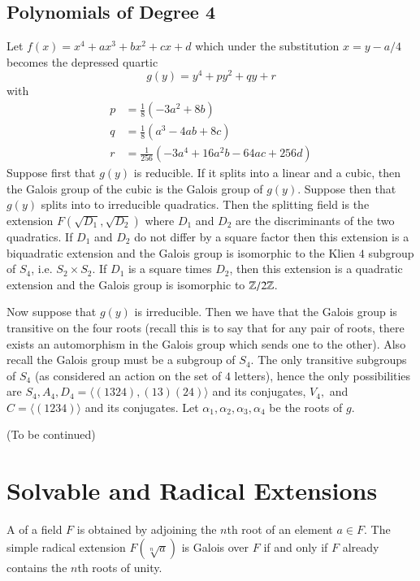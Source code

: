 \documentclass[12pt, a4paper, oneside, openright, titlepage]{book}
\begin{document}
\subsection{Polynomials of Degree 4}


Let $f(x) = x^4+ax^3+bx^2+cx+d$ which under the substitution $x = y-a/4$ becomes the depressed quartic \begin{equation*}
    g(y) = y^4 + py^2+qy+r
\end{equation*}
with \begin{align*}
    p &= \frac{1}{8}(-3a^2+8b) \\
    q &= \frac{1}{8}(a^3-4ab+8c) \\
    r &= \frac{1}{256}(-3a^4+16a^2b-64ac+256d)
\end{align*}
Suppose first that $g(y)$ is reducible. If it splits into a linear and a cubic, then the Galois group of the cubic is the Galois group of $g(y)$. Suppose then that $g(y)$ splits into to irreducible quadratics. Then the splitting field is the extension $F(\sqrt{D_1},\sqrt{D_2})$ where $D_1$ and $D_2$ are the discriminants of the two quadratics. If $D_1$ and $D_2$ do not differ by a square factor then this extension is a biquadratic extension and the Galois group is isomorphic to the Klien $4$ subgroup of $S_4$, i.e. $S_2 \times S_2$. If $D_1$ is a square times $D_2$, then this extension is a quadratic extension and the Galois group is isomorphic to $\mathbb Z/2\mathbb Z$.

Now suppose that $g(y)$ is irreducible. Then we have that the Galois group is transitive on the four roots (recall this is to say that for any pair of roots, there exists an automorphism in the Galois group which sends one to the other). Also recall the Galois group must be a subgroup of $S_4$. The only transitive subgroups of $S_4$ (as considered an action on the set of $4$ letters), hence the only possibilities are $S_4, A_4, D_4 = \langle (1324),(13)(24)\rangle$ and its conjugates, $V_4,$ and $C = \langle (1234)\rangle$ and its conjugates. Let $\alpha_1,\alpha_2,\alpha_3,\alpha_4$ be the roots of $g$. 

(To be continued)



\section{\textsection Solvable and Radical Extensions}


\begin{defn}
    A  of a field $F$ is obtained by adjoining the $n$th root of an element $a \in F$. The simple radical extension $F(\sqrt[n]{a})$ is Galois over $F$ if and only if $F$ already contains the $n$th roots of unity.
\end{defn}
\end{document}
